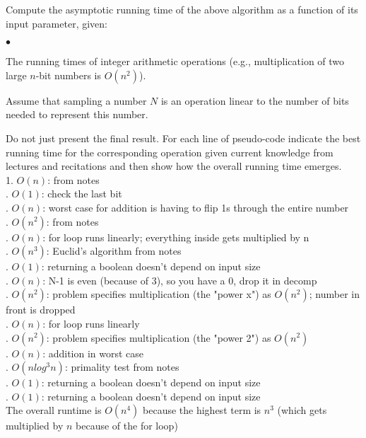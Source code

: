\documentclass{article}
\newenvironment{myitem}{\begin{list}{$\bullet$}
{\setlength{\itemsep}{-0pt}
\setlength{\topsep}{0pt}
\setlength{\labelwidth}{0pt}
\setlength{\leftmargin}{10pt}
\setlength{\parsep}{-0pt}
\setlength{\itemsep}{0pt}
\setlength{\partopsep}{0pt}}}%
{\end{list}}
\begin{document}
 Compute the asymptotic running time of the
above algorithm as a function of its input parameter, given:

\begin{myitem}
\item The running times of integer arithmetic operations (e.g.,
  multiplication of two large $n$-bit numbers is $O(n^2)$).
\item Assume that sampling a number $N$ is an operation linear to the
  number of bits needed to represent this number.
\end{myitem}

\noindent Do not just present the final result. For each line of
pseudo-code indicate the best running time for the corresponding
operation given current knowledge from lectures and recitations and
then show how the overall running time emerges.\\

1. $O(n)$: from notes\\
. $O(1)$: check the last bit\\
. $O(n)$: worst case for addition is having to flip 1s through the entire number\\
. $O(n^2)$: from notes\\
. $O(n)$: for loop runs linearly; everything inside gets multiplied by n\\
. $O(n^3)$: Euclid's algorithm from notes\\
. $O(1)$: returning a boolean doesn't depend on input size\\
. $O(n)$: N-1 is even (because of 3), so you have a 0, drop it in decomp\\
. $O(n^2)$: problem specifies multiplication (the "power x") as $O(n^2)$; number in front is dropped\\
. $O(n)$: for loop runs linearly\\
. $O(n^2)$: problem specifies multiplication (the "power 2") as $O(n^2)$\\
. $O(n)$: addition in worst case\\
. $O(n log^3n)$: primality test from notes\\
. $O(1)$: returning a boolean doesn't depend on input size\\
. $O(1)$: returning a boolean doesn't depend on input size\\
\indent The overall runtime is $O(n^4)$ because the highest term is $n^3$ (which gets multiplied by $n$ because of the for loop)
\end{document}
